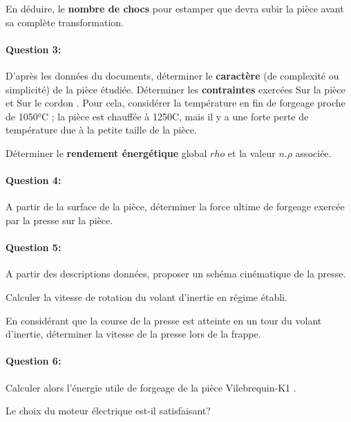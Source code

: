 En déduire, le \textbf{nombre de chocs} pour estamper que devra subir la pièce avant sa complète transformation.

\paragraph{Question 3:} D'après les données du documents, déterminer le \textbf{caractère} (de complexité ou simplicité) de la pièce étudiée. Déterminer les \textbf{contraintes} exercées \og Sur la pièce \fg et \og Sur le cordon \fg. Pour cela, considérer la température en fin de forgeage proche de 1050°C ; la pièce est chauffée à 1250\textdegree C, mais il y a une forte perte de température due à la petite taille de la pièce.

Déterminer le \textbf{rendement énergétique} global $rho$ et la valeur $n.\rho$ associée.

\paragraph{Question 4:} A partir de la surface de la pièce, déterminer la force ultime de forgeage exercée par la presse sur la pièce.

\paragraph{Question 5:} A partir des descriptions données, proposer un schéma cinématique de la presse.

Calculer la vitesse de rotation du volant d'inertie en régime établi.

En considérant que la course de la presse est atteinte en un tour du volant d'inertie, déterminer la vitesse de la presse lors de la frappe.

\paragraph{Question 6:} Calculer alors l'énergie utile de forgeage de la pièce \og Vilebrequin-K1 \fg.

Le choix du moteur électrique est-il satisfaisant?





\clearpage

\ifdef{\public}{}{}

\newpage

\pagestyle{correction}


